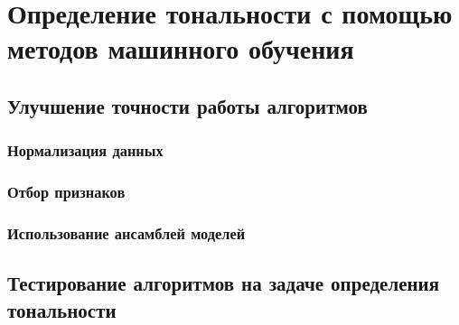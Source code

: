 \section{Определение тональности с помощью методов машинного обучения} 
\label{sec:sec_mlsent}




\subsection{Улучшение точности работы алгоритмов}

\subsubsection{Нормализация данных}
\subsubsection{Отбор признаков}
\subsubsection{Использование ансамблей моделей}

\subsection{Тестирование алгоритмов на задаче определения тональности}